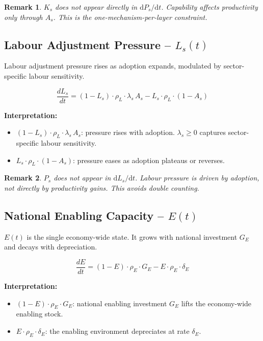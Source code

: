 \documentclass[11pt,a4paper]{article}
\newtheorem{remark}{Remark}
\begin{document}
\begin{remark}
$K_s$ does not appear directly in $\mathrm{d}P_s/\mathrm{d}t$. Capability affects productivity \emph{only through} $A_s$. This is the one-mechanism-per-layer constraint.
\end{remark}

\subsection{Labour Adjustment Pressure -- \texorpdfstring{$L_s(t)$}{Ls(t)}}

Labour adjustment pressure rises as adoption expands, modulated by sector-specific labour sensitivity.

\begin{equation}
\boxed{
\frac{dL_s}{dt}
= (1 - L_s)\cdot\rho_L\cdot\lambda_s\, A_s
- L_s\cdot\rho_L\cdot(1 - A_s)
}
\label{eq:Ls}
\end{equation}

\textbf{Interpretation:}
\begin{itemize}
  \item $(1 - L_s)\cdot\rho_L\cdot\lambda_s\, A_s$: pressure rises with adoption. $\lambda_s \geq 0$ captures sector-specific labour sensitivity.
  \item $L_s\cdot\rho_L\cdot(1 - A_s)$: pressure eases as adoption plateaus or reverses.
\end{itemize}

\begin{remark}
$P_s$ does not appear in $\mathrm{d}L_s/\mathrm{d}t$. Labour pressure is driven by adoption, not directly by productivity gains. This avoids double counting.
\end{remark}

\subsection{National Enabling Capacity -- \texorpdfstring{$E(t)$}{E(t)}}

$E(t)$ is the single economy-wide state. It grows with national investment $G_E$ and decays with depreciation.

\begin{equation}
\boxed{
\frac{dE}{dt}
= (1 - E)\cdot\rho_E\cdot G_E
- E\cdot\rho_E\cdot\delta_E
}
\label{eq:E}
\end{equation}

\textbf{Interpretation:}
\begin{itemize}
  \item $(1 - E)\cdot\rho_E\cdot G_E$: national enabling investment $G_E$ lifts the economy-wide enabling stock.
  \item $E\cdot\rho_E\cdot\delta_E$: the enabling environment depreciates at rate $\delta_E$.
\end{itemize}
\end{document}

